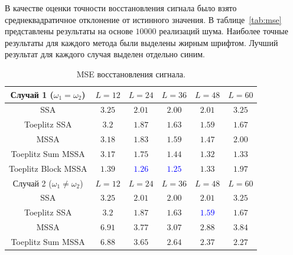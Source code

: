 \documentclass[specialist,
substylefile = spbu_report.rtx,
subf,href,colorlinks=true, 12pt]{disser}
\theoremstyle{definition}
\begin{document}
В качестве оценки точности восстановления сигнала было взято среднеквадратичное отклонение от истинного значения. В таблице~\ref{tab:mse} представлены результаты на основе $10000$ реализаций шума. Наиболее точные результаты для каждого метода были выделены жирным шрифтом. Лучший результат для каждого случая выделен отдельно синим.
\begin{table}[h]
	\centering
	\caption{MSE восстановления сигнала.}
		\begin{tabular}{cccccc}\hline
			Случай 1 ($\omega_1=\omega_2$)   & $L=12$  & $L=24$                     & $L=36$                     & $L=48$                     & $L=60$          \\
			\hline
			SSA                              & $3.25$  & $\mathbf{2.01}$            & $\mathbf{2.00}$            & $\mathbf{2.01}$            & $3.25$          \\
			\hline
			Toeplitz SSA                     & $3.2$   & $1.87$                     & $1.63$                     & $\mathbf{1.59}$            & $1.67$          \\
			\hline
			MSSA                             & $3.18$  & $1.83$                     & $1.59$                     & $\mathbf{1.47}$            & $2.00$          \\
			\hline
			Toeplitz Sum MSSA                & $3.17$  & $1.75$                     & $1.44$                     & $\mathbf{1.32}$            & $\mathbf{1.33}$ \\
			\hline
			Toeplitz Block MSSA              & $1.39$  & \textcolor{blue}{${\mathbf{1.26}}$} & \textcolor{blue}{${\mathbf{1.25}}$} & $1.33$                     & $1.97$          \\
			\hhline{======}
			Случай 2 ($\omega_1\ne\omega_2$) & $L=12$  & $L=24$                     & $L=36$                     & $L=48$                     & $L=60$          \\
			\hline
			SSA                              & $3.25$  & $\mathbf{2.01}$            & $\mathbf{2.00}$            & $\mathbf{2.01}$            & $3.25$          \\
			\hline
			Toeplitz SSA                     & $3.2$   & $1.87$                     & $1.63$                     & \textcolor{blue}{${\mathbf{1.59}}$} & $1.67$          \\
			\hline
			MSSA                             & $6.91$  & $3.77$                     & $3.07$                     & $\mathbf{2.88}$            & $3.84$          \\
			\hline
			Toeplitz Sum MSSA                & $6.88$  & $3.65$                     & $2.64$                     & $2.37$                     & $\mathbf{2.27}$ \\

\end{tabular}
\end{table}
\end{document}

